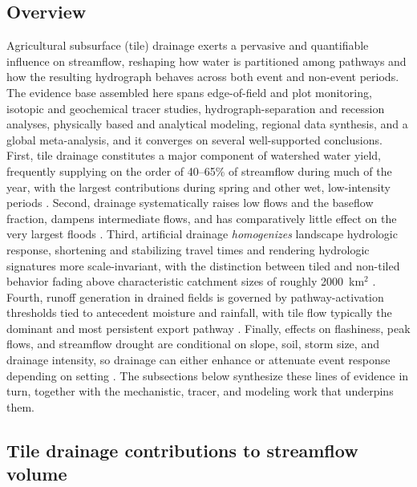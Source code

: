 \subsection{Overview}

Agricultural subsurface (tile) drainage exerts a pervasive and quantifiable influence on streamflow, reshaping how water is partitioned among pathways and how the resulting hydrograph behaves across both event and non-event periods. The evidence base assembled here spans edge-of-field and plot monitoring, isotopic and geochemical tracer studies, hydrograph-separation and recession analyses, physically based and analytical modeling, regional data synthesis, and a global meta-analysis, and it converges on several well-supported conclusions. First, tile drainage constitutes a major component of watershed water yield, frequently supplying on the order of 40--65\% of streamflow during much of the year, with the largest contributions during spring and other wet, low-intensity periods \parencite{King2014,Thomas2016,Schilling2019}. Second, drainage systematically raises low flows and the baseflow fraction, dampens intermediate flows, and has comparatively little effect on the very largest floods \parencite{Sloan2017,Schilling2008,Rathore2025}. Third, artificial drainage \emph{homogenizes} landscape hydrologic response, shortening and stabilizing travel times and rendering hydrologic signatures more scale-invariant, with the distinction between tiled and non-tiled behavior fading above characteristic catchment sizes of roughly 2000~km$^2$ \parencite{BolandBrien2014,DaneshYazdi2016,FoufoulaGeorgiou2015}. Fourth, runoff generation in drained fields is governed by pathway-activation thresholds tied to antecedent moisture and rainfall, with tile flow typically the dominant and most persistent export pathway \parencite{Williams2019,Williams2018,Macrae2019}. Finally, effects on flashiness, peak flows, and streamflow drought are conditional on slope, soil, storm size, and drainage intensity, so drainage can either enhance or attenuate event response depending on setting \parencite{Zhou2025,Rathore2025,Adelsperger2024}. The subsections below synthesize these lines of evidence in turn, together with the mechanistic, tracer, and modeling work that underpins them.

\subsection{Tile drainage contributions to streamflow volume}


